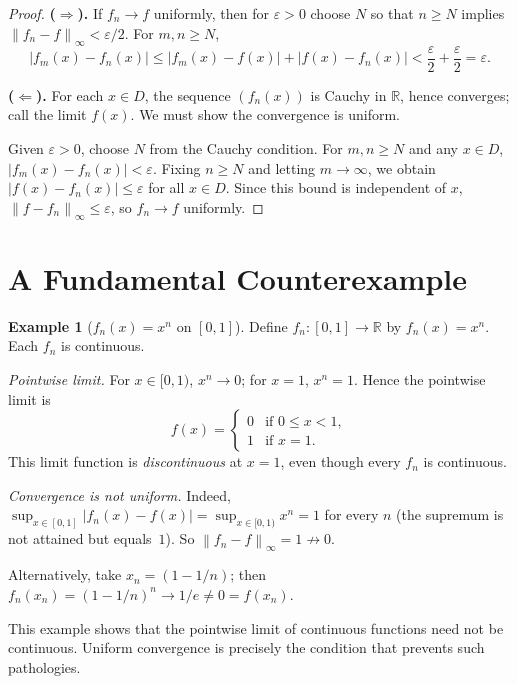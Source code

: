 \documentclass[12pt,a4paper]{book}
\theoremstyle{definition}
\newtheorem{example}{Example}[chapter]
\newcommand{\R}{\mathbb{R}}
\newcommand{\eps}{\varepsilon}
\newcommand{\abs}[1]{\left\lvert #1 \right\rvert}
\newcommand{\norm}[1]{\left\lVert #1 \right\rVert}
\begin{document}
\begin{proof}
  \textbf{($\Rightarrow$).}\;
  If $f_n\to f$ uniformly, then for $\eps>0$ choose $N$ so that
  $n\ge N$ implies $\norm{f_n-f}_\infty<\eps/2$.  For $m,n\ge N$,
  \[
    \abs{f_m(x)-f_n(x)} \le \abs{f_m(x)-f(x)}+\abs{f(x)-f_n(x)}
    < \frac{\eps}{2}+\frac{\eps}{2}=\eps.
  \]

  \textbf{($\Leftarrow$).}\;
  For each $x\in D$, the sequence $(f_n(x))$ is Cauchy in $\R$, hence
  converges; call the limit $f(x)$.  We must show the convergence is
  uniform.

  Given $\eps>0$, choose $N$ from the Cauchy condition.  For $m,n\ge N$
  and any $x\in D$, $\abs{f_m(x)-f_n(x)}<\eps$.  Fixing $n\ge N$ and
  letting $m\to\infty$, we obtain $\abs{f(x)-f_n(x)}\le\eps$ for all
  $x\in D$.  Since this bound is independent of $x$,
  $\norm{f-f_n}_\infty\le\eps$, so $f_n\to f$ uniformly.
\end{proof}


\section{A Fundamental Counterexample}\label{sec:counterexample-xn}

\begin{example}[{$f_n(x)=x^n$ on $[0,1]$}]\label{ex:xn-counterexample}
  Define $f_n\colon[0,1]\to\R$ by $f_n(x)=x^n$.  Each $f_n$ is
  continuous.

  \emph{Pointwise limit.}\;
  For $x\in[0,1)$, $x^n\to0$; for $x=1$, $x^n=1$.  Hence the pointwise
  limit is
  \[
    f(x) = \begin{cases} 0 & \text{if } 0\le x<1,\\ 1 & \text{if } x=1.
    \end{cases}
  \]
  This limit function is \emph{discontinuous} at $x=1$, even though
  every $f_n$ is continuous.

  \emph{Convergence is not uniform.}\;
  Indeed, $\sup_{x\in[0,1]}\abs{f_n(x)-f(x)}
  =\sup_{x\in[0,1)}x^n=1$ for every $n$ (the supremum is not attained
  but equals~$1$).  So $\norm{f_n-f}_\infty=1\not\to0$.

  Alternatively, take $x_n=(1-1/n)$; then
  $f_n(x_n)=(1-1/n)^n\to1/e\ne0=f(x_n)$.
\end{example}

This example shows that the pointwise limit of continuous functions need
not be continuous.  Uniform convergence is precisely the condition that
prevents such pathologies.
\end{document}
